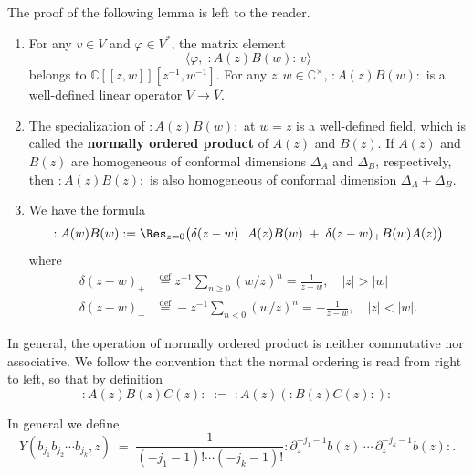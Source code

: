\documentclass[12pt]{article}
\begin{document}
The proof of the following lemma is left to the reader.

\begin{lemma}[2.2.3]
    \leavevmode
    \begin{enumerate}
        \item
              For any $v\in V$ and $\varphi\in V^*$, the matrix element
              \[
                  \langle \varphi,\; :A(z)B(w):\,v\rangle
              \]
              belongs to $\mathbb{C}[[z,w]][z^{-1},w^{-1}]$.
              For any $z,w\in\mathbb{C}^\times$, $:A(z)B(w):$ is a well-defined linear operator $V\to\overline{V}$.

        \item
              The specialization of $:A(z)B(w):$ at $w=z$ is a well-defined field,
              which is called the \textbf{normally ordered product} of $A(z)$ and $B(z)$.
              If $A(z)$ and $B(z)$ are homogeneous of conformal dimensions
              $\Delta_A$ and $\Delta_B$, respectively, then
              $:A(z)B(z):$ is also homogeneous of conformal dimension $\Delta_A+\Delta_B$.
        \item We have the formula
              \[
                  :A(w)B(w):
                  = \Res_{z=0}\big(
                  \delta(z-w)_-A(z)B(w)
                  \;+\;
                  \delta(z-w)_+B(w)A(z)
                  \big)
              \] where \begin{align*}
                  \delta(z-w)_+ & \stackrel{\mathrm{def}}{=} z^{-1}\sum_{n\ge0} (w/z)^n = \frac{1}{z-w}, \quad |z|>|w|  \\
                  \delta(z-w)_- & \stackrel{\mathrm{def}}{=} -z^{-1}\sum_{n<0} (w/z)^n = -\frac{1}{z-w}, \quad |z|<|w|.
              \end{align*}
    \end{enumerate}
\end{lemma}


\begin{remark}
    In general, the operation of normally ordered product is neither commutative nor associative.
    We follow the convention that the normal ordering is read from right to left,
    so that by definition
    \[
        :A(z)B(z)C(z):
        \;:=\;
        :A(z)(:B(z)C(z):):
    \]
\end{remark}

In general we define
\begin{equation}\label{2.2.3}
    Y(b_{j_1} b_{j_2} \cdots b_{j_k}, z)
    \;=\;
    \frac{1}{(-j_1-1)!\cdots(-j_k-1)!}
    :\partial_z^{-j_1-1} b(z)\,\cdots\,\partial_z^{-j_k-1} b(z):.
\end{equation}
\end{document}
